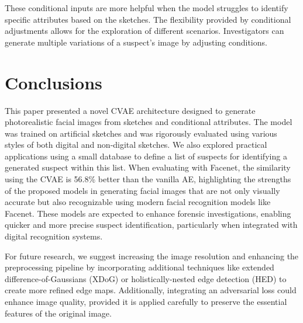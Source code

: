 \documentclass{IEEEcsmag}
\begin{document}
These conditional inputs are more helpful when the model struggles to identify specific attributes based on the sketches. The flexibility provided by conditional adjustments allows for the exploration of different scenarios. Investigators can generate multiple variations of a suspect's image by adjusting conditions.


\section{Conclusions}
\label{sec:conclusion}

This paper presented a novel CVAE architecture designed to generate photorealistic facial images from sketches and conditional attributes. The model was trained on artificial sketches and was rigorously evaluated using various styles of both digital and non-digital sketches. We also explored practical applications using a small database to define a list of suspects for identifying a generated suspect within this list. When evaluating with Facenet, the similarity using the CVAE is 56.8\% better than the vanilla AE, highlighting the strengths of the proposed models in generating facial images that are not only visually accurate but also recognizable using modern facial recognition models like Facenet. These models are expected to enhance forensic investigations, enabling quicker and more precise suspect identification, particularly when integrated with digital recognition systems.

For future research, we suggest increasing the image resolution and enhancing the preprocessing pipeline by incorporating additional techniques like extended difference-of-Gaussians (XDoG) or holistically-nested edge detection (HED) to create more refined edge maps. Additionally, integrating an adversarial loss could enhance image quality, provided it is applied carefully to preserve the essential features of the original image.


\end{document}
